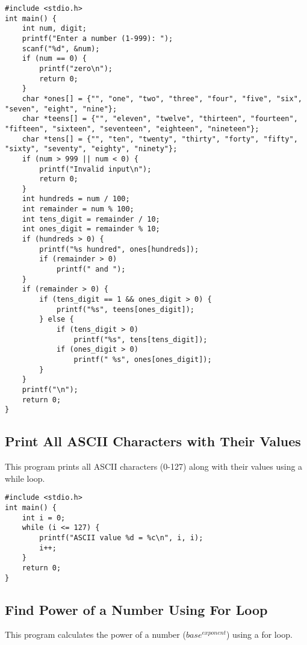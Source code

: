 \documentclass[a4paper,12pt]{article}
\begin{document}
\begin{lstlisting}[caption={Enter a Number and Print It in Words}]
#include <stdio.h>
int main() {
    int num, digit;
    printf("Enter a number (1-999): ");
    scanf("%d", &num);
    if (num == 0) {
        printf("zero\n");
        return 0;
    }
    char *ones[] = {"", "one", "two", "three", "four", "five", "six", "seven", "eight", "nine"};
    char *teens[] = {"", "eleven", "twelve", "thirteen", "fourteen", "fifteen", "sixteen", "seventeen", "eighteen", "nineteen"};
    char *tens[] = {"", "ten", "twenty", "thirty", "forty", "fifty", "sixty", "seventy", "eighty", "ninety"};
    if (num > 999 || num < 0) {
        printf("Invalid input\n");
        return 0;
    }
    int hundreds = num / 100;
    int remainder = num % 100;
    int tens_digit = remainder / 10;
    int ones_digit = remainder % 10;
    if (hundreds > 0) {
        printf("%s hundred", ones[hundreds]);
        if (remainder > 0)
            printf(" and ");
    }
    if (remainder > 0) {
        if (tens_digit == 1 && ones_digit > 0) {
            printf("%s", teens[ones_digit]);
        } else {
            if (tens_digit > 0)
                printf("%s", tens[tens_digit]);
            if (ones_digit > 0)
                printf(" %s", ones[ones_digit]);
        }
    }
    printf("\n");
    return 0;
}
\end{lstlisting}

\newpage

\subsection{Print All ASCII Characters with Their Values}
This program prints all ASCII characters (0-127) along with their values using a while loop.

\begin{lstlisting}[caption={Print All ASCII Characters with Their Values}]
#include <stdio.h>
int main() {
    int i = 0;
    while (i <= 127) {
        printf("ASCII value %d = %c\n", i, i);
        i++;
    }
    return 0;
}
\end{lstlisting}

\newpage

\subsection{Find Power of a Number Using For Loop}
This program calculates the power of a number (\(base^{exponent}\)) using a for loop.
\end{document}
